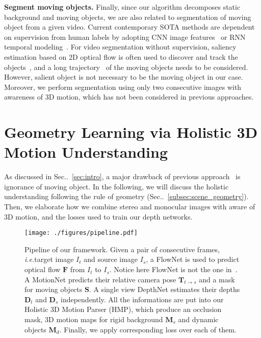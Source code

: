 \documentclass[runningheads]{llncs}
\makeatletter
\newcommand{\secref}[1]{Sec\onedot~\ref{#1}}
\newcommand{\ve}[1]{{\mathbf #1}} \newcommand{\hua}[1]{{\mathcal #1}}
\DeclareRobustCommand\onedot{\futurelet\@let@token\@onedot}
\def\onedot{\ifx\@let@token.\else.\null\fi\xspace}
\def\ie{\emph{i.e.}}
\makeatother
\begin{document}
\noindent\textbf{Segment moving objects.}
Finally, since our algorithm decomposes static background and moving objects, we are also related to segmentation of moving object from a given video. 
Current contemporary SOTA methods are dependent on supervision from human labels by adopting CNN image features~\cite{fragkiadaki2015learning,yoon2017pixel} or RNN temporal modeling~\cite{tokmakov2017learning}. 
For video segmentation without supervision, saliency estimation based on 2D optical flow is often used to discover and track the objects~\cite{wang2018saliency,faktor2014video,yang2017spatio}, and a long trajectory~\cite{brox2010object,kim2018face} of the moving objects needs to be considered. However, salient object is not necessary to be the moving object in our case. Moreover, we perform segmentation using only two consecutive images with awareness of 3D motion, which has not been considered in previous approaches. 










 
\section{Geometry Learning via Holistic 3D Motion Understanding}
\label{sec:approach}
As discussed in \secref{sec:intro}, a major drawback of previous approach~\cite{zhou2017unsupervised,yang2018cvpr} is ignorance of moving object. In the following, we will discuss the holistic understanding following the rule of geometry (\secref{subsec:scene_geometry}). Then, we elaborate how we combine stereo and monocular images with aware of 3D motion, and the losses used to train our depth networks.



\begin{figure*}[t]
\centering
\texttt{[image: ./figures/pipeline.pdf]}
\caption{Pipeline of our framework. Given a pair of consecutive frames, \ie target image $I_t$ and source image $I_{s}$, a FlowNet is used to predict optical flow $\ve{F}$ from $I_t$ to $I_{s}$. Notice here FlowNet is not the one in~\cite{IMKDB17}.
A MotionNet predicts their relative camera pose $\ve{T}_{t\rightarrow s}$ and a mask for moving objects $\ve{S}$. A single view DepthNet estimates their depths $\ve{D}_t$ and $\ve{D}_{s}$ independently. All the informations are put into our Holistic 3D Motion Parser (HMP), which produce an occlusion mask, 3D motion maps for rigid background $\ve{M}_s$ and dynamic objects $\ve{M}_d$. Finally, we apply corresponding loss over each of them.}
\label{fig:pipeline}
\vspace{-0.5\baselineskip}
\end{figure*}
\end{document}
